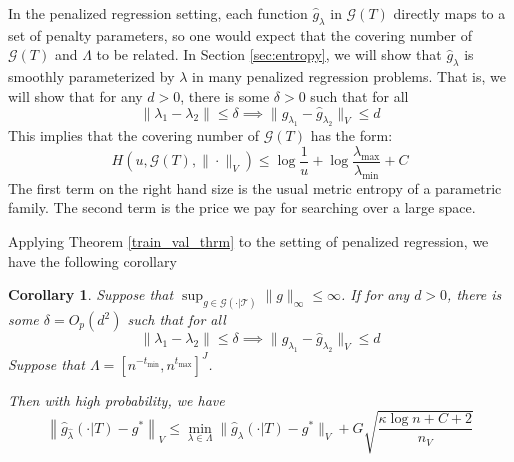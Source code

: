 \documentclass[12pt]{article}
\newtheorem{corollary}{Corollary}
\begin{document}
In the penalized regression setting, each function $\hat{g}_\lambda$ in $\mathcal{G}(T)$ directly maps to a set of penalty parameters, so one would expect that the covering number of $\mathcal{G}(T)$ and $\Lambda$ to be related. In Section \ref{sec:entropy}, we will show that $\hat{g}_\lambda$ is smoothly parameterized by $\lambda$ in many penalized regression problems. That is, we will show that for any $d> 0$, there is some $\delta > 0$ such that for all
\begin{equation}
\label{fit_func_smooth}
\| \lambda_1 - \lambda_2 \| \le \delta \implies \| \hat{g}_{\lambda_1} - \hat{g}_{\lambda_2} \|_V \le d
\end{equation}
This implies that the covering number of $\mathcal{G}(T)$ has the form:
\begin{equation}
\label{entropy_bound}
H(u, \mathcal{G}(T), \| \cdot \|_V) \le \log \frac{1}{u} + \log \frac{\lambda_{\max}}{\lambda_{\min}} + C
\end{equation}
The first term on the right hand size is the usual metric entropy of a parametric family. The second term is the price we pay for searching over a large space.

Applying Theorem \ref{train_val_thrm} to the setting of penalized regression, we have the following corollary

\begin{corollary}
\label{train_val_corr}
Suppose that $\sup_{g \in \mathcal{G(\cdot | T)}} \| g \|_\infty \le \infty$.
If for any $d> 0$, there is some $\delta = O_p(d^2)$ such that for all
\begin{equation}
\| \lambda_1 - \lambda_2 \| \le \delta \implies \| \hat{g}_{\lambda_1} - \hat{g}_{\lambda_2} \|_V \le d
\end{equation}
Suppose that $\Lambda = [ n^{-t_{\min}}, n^{t_{\max}} ]^J $.

Then with high probability, we have
\begin{equation}
\label{error_bound}
\left \|\hat{g}_{\hat{\lambda} }(\cdot | T) - g^* \right \|_V
\le 
\min_{\lambda \in \Lambda}\| \hat{g}_{\lambda}(\cdot | T) - g^*\|_V
+ G \sqrt{\frac{\kappa \log n + C + 2}{n_V}}
\end{equation}
\end{corollary}
\end{document}
